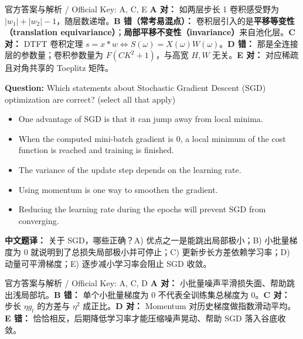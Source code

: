 \begin{StudySolution}{官方答案与解析 / Official Key: A, C, E}
\textbf{A 对：} 如两层步长 1 卷积感受野为 $|w_1|+|w_2|-1$，随层数递增。\textbf{B 错（常考易混点）：} 卷积层引入的是\textbf{平移等变性（translation equivariance）}；\textbf{局部平移不变性（invariance）}来自池化层。\textbf{C 对：} DTFT 卷积定理 $s=x*w \Leftrightarrow S(\omega)=X(\omega)W(\omega)$。\textbf{D 错：} 那是全连接层的参数量；卷积参数量为 $F(CK^2+1)$，与高宽 $H,W$ 无关。\textbf{E 对：} 对应稀疏且对角共享的 Toeplitz 矩阵。
\end{StudySolution}

\textbf{Question:} Which statements about Stochastic Gradient Descent (SGD) optimization are correct? (select all that apply)
\begin{itemize}
\item[A)] One advantage of SGD is that it can jump away from local minima.
\item[B)] When the computed mini-batch gradient is 0, a local minimum of the cost function is reached and training is finished.
\item[C)] The variance of the update step depends on the learning rate.
\item[D)] Using momentum is one way to smoothen the gradient.
\item[E)] Reducing the learning rate during the epochs will prevent SGD from converging.
\end{itemize}
\textbf{中文题译：} 关于 SGD，哪些正确？A) 优点之一是能跳出局部极小；B) 小批量梯度为 0 就说明到了总损失局部极小并可停止；C) 更新步长方差依赖学习率；D) 动量可平滑梯度；E) 逐步减小学习率会阻止 SGD 收敛。

\begin{StudySolution}{官方答案与解析 / Official Key: A, C, D}
\textbf{A 对：} 小批量噪声平滑损失面、帮助跳出浅局部坑。\textbf{B 错：} 单个小批量梯度为 0 不代表全训练集总梯度为 0。\textbf{C 对：} 步长 $\eta g_t$ 的方差与 $\eta^2$ 成正比。\textbf{D 对：} Momentum 对历史梯度做指数滑动平均。\textbf{E 错：} 恰恰相反，后期降低学习率才能压缩噪声晃动、帮助 SGD 落入谷底收敛。
\end{StudySolution}

